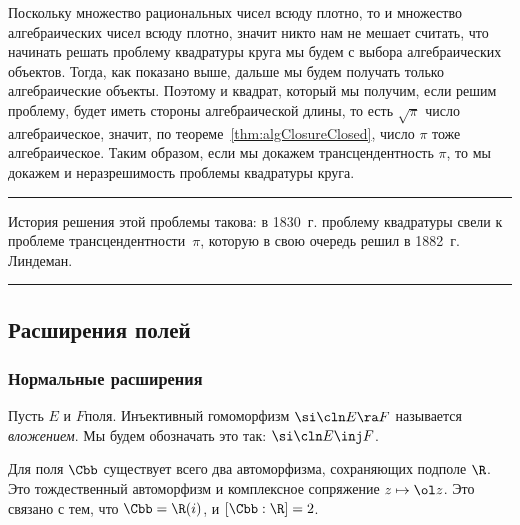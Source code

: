\documentclass[a4paper]{article}
\newenvironment{petit}
{\par\smallskip\hrule\smallskip\footnotesize}{\par\smallskip\hrule\smallskip}
\begin{document}
Поскольку множество рациональных чисел всюду плотно, то и множество алгебраических чисел всюду плотно, значит
никто нам не мешает считать, что начинать решать проблему квадратуры круга мы будем с выбора алгебраических
объектов. Тогда, как показано выше, дальше мы будем получать только алгебраические объекты. Поэтому и
квадрат, который мы получим, если решим проблему, будет иметь стороны алгебраической длины, то есть $\sqrt{\pi}$\т
число алгебраическое, значит, по теореме~\ref{thm:algClosureClosed}, число $\pi$ тоже алгебраическое. Таким образом,
если мы докажем трансцендентность $\pi$, то мы докажем и неразрешимость проблемы квадратуры круга.

\begin{petit}
История решения этой проблемы такова: в 1830~г. проблему квадратуры свели к проблеме трансцендентности~$\pi$,
которую в свою очередь решил в 1882~г. Линдеман.
\end{petit}

\subsection{Расширения полей}

\subsubsection{Нормальные расширения}

\begin{df}
Пусть $E$ и $F$\т поля. Инъективный гомоморфизм $\si\cln E\ra F$ называется \emph{вложением}.
Мы будем обозначать это так: $\si\cln E \inj F$.
\end{df}

\begin{ex}
Для поля $\Cbb$ существует всего два автоморфизма, сохраняющих подполе $\R$.
Это тождественный автоморфизм и комплексное сопряжение $z \mapsto \ol z$.
Это связано с тем, что $\Cbb=\R(i)$, и $[\Cbb:\R] = 2$.
\end{ex}
\end{document}
